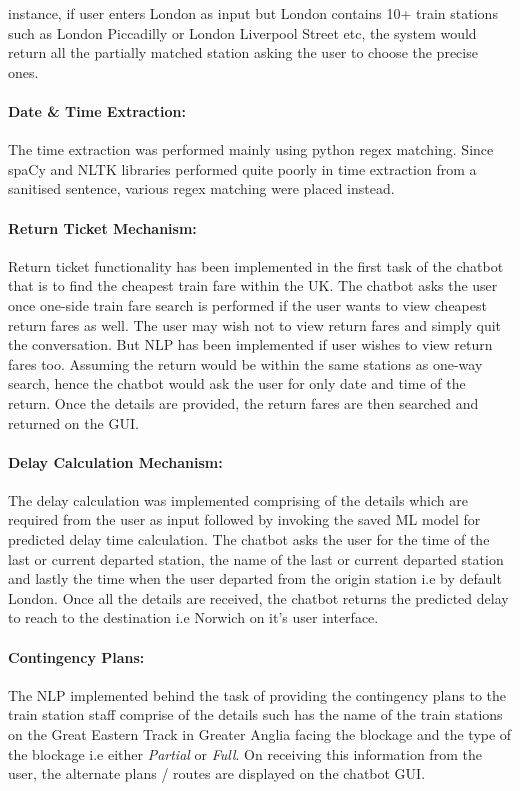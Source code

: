 instance, if user enters London as input but London contains 10+ train stations such as London Piccadilly or London Liverpool Street etc, the system would return all the partially matched station asking the user to choose the precise ones. \paragraph{Date \& Time Extraction:} The time extraction was performed mainly using python regex matching. Since spaCy and NLTK libraries performed quite poorly in time extraction from a sanitised sentence, various regex matching were placed instead. \paragraph{Return Ticket Mechanism:} Return ticket functionality has been implemented in the first task of the chatbot that is to find the cheapest train fare within the UK. The chatbot asks the user once one-side train fare search is performed if the user wants to view cheapest return fares as well. The user may wish not to view return fares and simply quit the conversation. But NLP has been implemented if user wishes to view return fares too. Assuming the return would be within the same stations as one-way search, hence the chatbot would ask the user for only date and time of the return. Once the details are provided, the return fares are then searched and returned on the GUI. \paragraph{Delay Calculation Mechanism:} The delay calculation was implemented comprising of the details which are required from the user as input followed by invoking the saved ML model for predicted delay time calculation. The chatbot asks the user for the time of the last or current departed station, the name of the last or current departed station and lastly the time when the user departed from the origin station i.e by default London. Once all the details are received, the chatbot returns the predicted delay to reach to the destination i.e Norwich on it's user interface. \paragraph{Contingency Plans:} The NLP implemented behind the task of providing the contingency plans to the train station staff comprise of the details such has the name of the train stations on the Great Eastern Track in Greater Anglia facing the blockage and the type of the blockage i.e either \textit{Partial} or \textit{Full}. On receiving this information from the user, the alternate plans / routes are displayed on the chatbot GUI.

